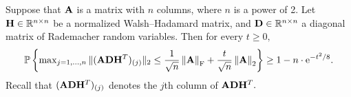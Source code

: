\begin{lemma}
\label{ch3:lemma:cologorm-tail-bound}
Suppose that $\mathbf{A}$ is a matrix with $n$ columns, where $n$ is a power of 2. 
Let $\mathbf{H} \in \mathbb{R}^{n \times n}$ be a normalized Walsh--Hadamard matrix, and 
$\mathbf{D} \in \mathbb{R}^{n \times n}$ a diagonal matrix of Rademacher random variables. 
Then for every $t \geq 0,$
\[
 \mathbb{P}\left\{ \max\nolimits_{j=1,...,n} 
 \| (\mathbf{A} \mathbf{D} \mathbf{H}^T)_{(j)}\|_2  \leq 
  \frac{1}{\sqrt{n} } \left\|\mathbf{A}\right\|_\mathrm{F} + \frac{t}{\sqrt{n}} \left\|\mathbf{A}\right\|_2 \right\} \geq
  1 - n \cdot \mathrm{e}^{-t^2/8}.
\]
Recall that $(\mathbf{A} \mathbf{D} \mathbf{H}^T)_{(j)}$ denotes the $j$th column of $\mathbf{A} \mathbf{D} \mathbf{H}^T.$
\end{lemma}

